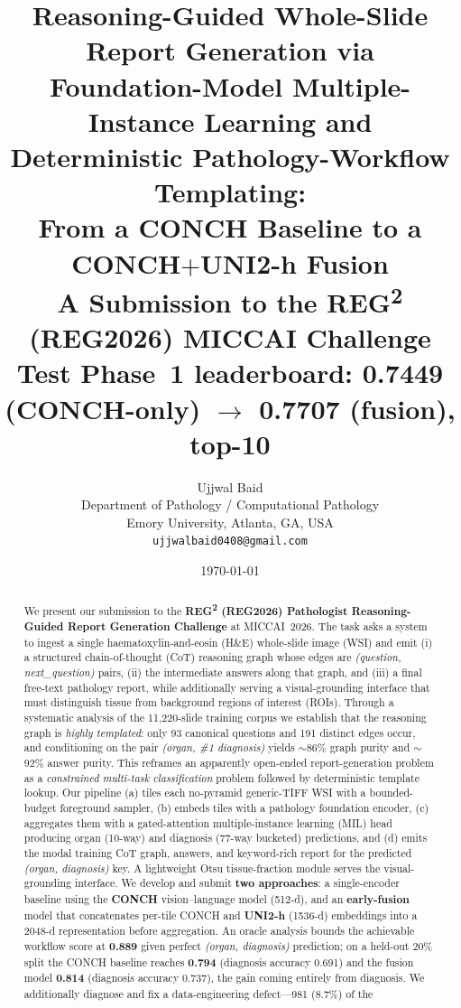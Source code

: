 \documentclass[11pt,a4paper]{article}
\title{\textbf{Reasoning-Guided Whole-Slide Report Generation via\\
Foundation-Model Multiple-Instance Learning and\\
Deterministic Pathology-Workflow Templating:\\
From a CONCH Baseline to a CONCH$+$UNI2-h Fusion}\\[4pt]
\large A Submission to the REG\textsuperscript{2} (REG2026) MICCAI Challenge\\
\normalsize \textnormal{Test Phase~1 leaderboard: 0.7449 (CONCH-only) $\rightarrow$ \textbf{0.7707} (fusion), top-10}}
\author{Ujjwal Baid\\
Department of Pathology / Computational Pathology\\
Emory University, Atlanta, GA, USA\\
\texttt{ujjwalbaid0408@gmail.com}}
\date{\today}
\begin{document}
\maketitle

\begin{abstract}
\noindent
We present our submission to the \textbf{REG\textsuperscript{2} (REG2026) Pathologist
Reasoning-Guided Report Generation Challenge} at MICCAI~2026. The task asks a system to
ingest a single haematoxylin-and-eosin (H\&E) whole-slide image (WSI) and emit (i) a
structured chain-of-thought (CoT) reasoning graph whose edges are
\emph{(question,\,next\_question)} pairs, (ii) the intermediate answers along that graph,
and (iii) a final free-text pathology report, while additionally serving a visual-grounding
interface that must distinguish tissue from background regions of interest (ROIs). Through a
systematic analysis of the 11{,}220-slide training corpus we establish that the reasoning
graph is \emph{highly templated}: only 93 canonical questions and 191 distinct edges occur,
and conditioning on the pair \emph{(organ, \#1 diagnosis)} yields $\sim$86\% graph purity and
$\sim$92\% answer purity. This reframes an apparently open-ended report-generation problem as
a \emph{constrained multi-task classification} problem followed by deterministic template
lookup. Our pipeline (a) tiles each no-pyramid generic-TIFF WSI with a bounded-budget
foreground sampler, (b) embeds tiles with a pathology foundation encoder, (c) aggregates them
with a gated-attention multiple-instance learning (MIL) head producing organ (10-way) and
diagnosis (77-way bucketed) predictions, and (d) emits the modal training CoT graph, answers,
and keyword-rich report for the predicted \emph{(organ, diagnosis)} key. A lightweight Otsu
tissue-fraction module serves the visual-grounding interface. We develop and submit \textbf{two
approaches}: a single-encoder baseline using the \textbf{CONCH} vision--language model (512-d),
and an \textbf{early-fusion} model that concatenates per-tile CONCH and \textbf{UNI2-h} (1536-d)
embeddings into a 2048-d representation before aggregation. An oracle analysis bounds the
achievable workflow score at \textbf{0.889} given perfect \emph{(organ, diagnosis)} prediction;
on a held-out 20\% split the CONCH baseline reaches \textbf{0.794} (diagnosis accuracy 0.691)
and the fusion model \textbf{0.814} (diagnosis accuracy 0.737), the gain coming entirely from
diagnosis. We additionally diagnose and fix a data-engineering defect---981 (8.7\%) of the

\end{abstract}
\end{document}
